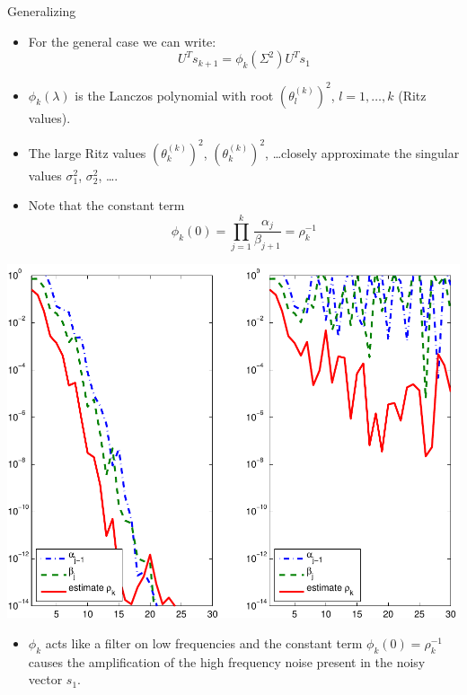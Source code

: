 \documentclass{beamer}
\begin{document}
\begin{frame}{Generalizing}
  \begin{itemize}
    \item For the general case we can write:
      \begin{equation*}
	U^{T}s_{k+1} = \phi_{k}(\Sigma^{2})U^{T}s_{1}
      \end{equation*}

    \item $\phi_{k}(\lambda)$ is the Lanczos polynomial with root 
      $(\theta_{l}^{(k)})^{2}$, $l = 1,\ldots,k$ (Ritz values).

    \item The large Ritz values $(\theta_{k}^{(k)})^{2}$, 
      $(\theta_{k}^{(k)})^{2}$, \ldots closely approximate the singular values
      $\sigma_{1}^{2}$, $\sigma_{2}^{2}$, \ldots.

    \item Note that the constant term
      \begin{equation*}
	\phi_{k}(0) = \prod_{j=1}^{k}\frac{\alpha_{j}}{\beta_{j+1}} = 
	\rho_{k}^{-1}
      \end{equation*}
  \end{itemize}
\end{frame}

\begin{frame}
  \begin{center}
    \includegraphics[width=0.55\linewidth]{figures/run1/alpha_beta_est}
  \end{center}
  \begin{itemize}
    \item $\phi_{k}$ acts like a filter on low frequencies and the constant term
      $\phi_{k}(0) = \rho_{k}^{-1}$ causes the amplification of the high
      frequency noise present in the noisy vector $s_{1}$.
  \end{itemize}
\end{frame}
\end{document}
